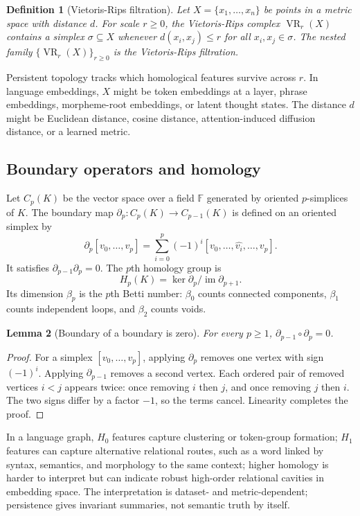 \documentclass[11pt]{article}
\newtheorem{definition}{Definition}[section]
\newtheorem{lemma}[definition]{Lemma}
\newcommand{\VR}{\operatorname{VR}}
\newcommand{\1}{\mathbf{1}}
\begin{document}
\begin{definition}[Vietoris-Rips filtration]
Let $X=\{x_1,\dots,x_n\}$ be points in a metric space with distance $d$. For scale $r\ge 0$, the Vietoris-Rips complex $\VR_r(X)$ contains a simplex $\sigma\subseteq X$ whenever $d(x_i,x_j)\le r$ for all $x_i,x_j\in\sigma$. The nested family $\{\VR_r(X)\}_{r\ge0}$ is the Vietoris-Rips filtration.
\end{definition}

Persistent topology tracks which homological features survive across $r$. In language embeddings, $X$ might be token embeddings at a layer, phrase embeddings, morpheme-root embeddings, or latent thought states. The distance $d$ might be Euclidean distance, cosine distance, attention-induced diffusion distance, or a learned metric.

\subsection{Boundary operators and homology}

Let $C_p(K)$ be the vector space over a field $\mathbb{F}$ generated by oriented $p$-simplices of $K$. The boundary map $\partial_p:C_p(K)\to C_{p-1}(K)$ is defined on an oriented simplex by
\[
\partial_p[v_0,\ldots,v_p]=\sum_{i=0}^p(-1)^i[v_0,\ldots,\widehat{v_i},\ldots,v_p].
\]
It satisfies $\partial_{p-1}\partial_p=0$. The $p$th homology group is
\[
H_p(K)=\ker \partial_p/\operatorname{im}\partial_{p+1}.
\]
Its dimension $\beta_p$ is the $p$th Betti number: $\beta_0$ counts connected components, $\beta_1$ counts independent loops, and $\beta_2$ counts voids.

\begin{lemma}[Boundary of a boundary is zero]
For every $p\ge 1$, $\partial_{p-1}\circ\partial_p=0$.
\end{lemma}
\begin{proof}
For a simplex $[v_0,\ldots,v_p]$, applying $\partial_p$ removes one vertex with sign $(-1)^i$. Applying $\partial_{p-1}$ removes a second vertex. Each ordered pair of removed vertices $i<j$ appears twice: once removing $i$ then $j$, and once removing $j$ then $i$. The two signs differ by a factor $-1$, so the terms cancel. Linearity completes the proof.
\end{proof}

In a language graph, $H_0$ features capture clustering or token-group formation; $H_1$ features can capture alternative relational routes, such as a word linked by syntax, semantics, and morphology to the same context; higher homology is harder to interpret but can indicate robust high-order relational cavities in embedding space. The interpretation is dataset- and metric-dependent; persistence gives invariant summaries, not semantic truth by itself.
\end{document}
